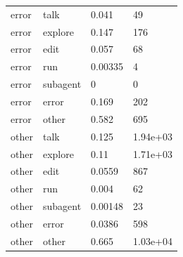 \begin{tabular}{llll}
error & talk & 0.041 & 49 \\
error & explore & 0.147 & 176 \\
error & edit & 0.057 & 68 \\
error & run & 0.00335 & 4 \\
error & subagent & 0 & 0 \\
error & error & 0.169 & 202 \\
error & other & 0.582 & 695 \\
other & talk & 0.125 & 1.94e+03 \\
other & explore & 0.11 & 1.71e+03 \\
other & edit & 0.0559 & 867 \\
other & run & 0.004 & 62 \\
other & subagent & 0.00148 & 23 \\
other & error & 0.0386 & 598 \\
other & other & 0.665 & 1.03e+04 \\
\bottomrule
\end{tabular}